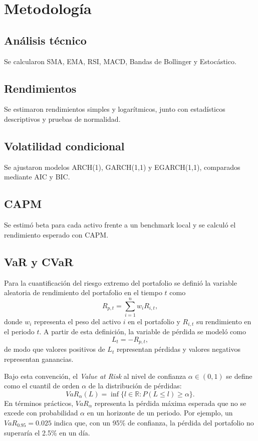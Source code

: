 \documentclass[11pt]{article}
\begin{document}
\section{Metodología}
\subsection{Análisis técnico}
Se calcularon SMA, EMA, RSI, MACD, Bandas de Bollinger y Estocástico.

\subsection{Rendimientos}
Se estimaron rendimientos simples y logarítmicos, junto con estadísticos descriptivos y pruebas de normalidad.

\subsection{Volatilidad condicional}
Se ajustaron modelos ARCH(1), GARCH(1,1) y EGARCH(1,1), comparados mediante AIC y BIC.

\subsection{CAPM}
Se estimó beta para cada activo frente a un benchmark local y se calculó el rendimiento esperado con CAPM.

\subsection{VaR y CVaR}
Para la cuantificación del riesgo extremo del portafolio se definió la variable aleatoria de rendimiento del portafolio en el tiempo \(t\) como
\[
R_{p,t}=\sum_{i=1}^{n} w_i R_{i,t},
\]
donde \(w_i\) representa el peso del activo \(i\) en el portafolio y \(R_{i,t}\) su rendimiento en el periodo \(t\). A partir de esta definición, la variable de pérdida se modeló como
\[
L_t=-R_{p,t},
\]
de modo que valores positivos de \(L_t\) representan pérdidas y valores negativos representan ganancias.

Bajo esta convención, el \textit{Value at Risk} al nivel de confianza \(\alpha\in(0,1)\) se define como el cuantil de orden \(\alpha\) de la distribución de pérdidas:
\[
VaR_{\alpha}(L)=\inf\{l\in\mathbb{R}: P(L\leq l)\geq \alpha\}.
\]
En términos prácticos, \(VaR_{\alpha}\) representa la pérdida máxima esperada que no se excede con probabilidad \(\alpha\) en un horizonte de un periodo. Por ejemplo, un \(VaR_{0.95}=0.025\) indica que, con un 95\% de confianza, la pérdida del portafolio no superaría el 2.5\% en un día.
\end{document}
